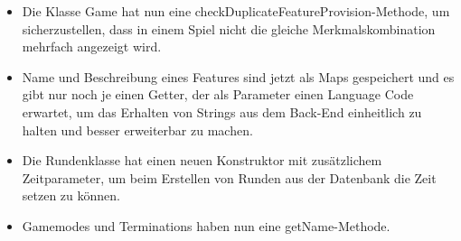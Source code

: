 \documentclass[a4paper]{scrreprt}
\begin{document}
\begin{itemize}
	\item Die Klasse Game hat nun eine checkDuplicateFeatureProvision-Methode, um sicherzustellen, dass in einem Spiel nicht die gleiche Merkmalskombination mehrfach angezeigt wird.
	\item Name und Beschreibung eines Features sind jetzt als Maps gespeichert und es gibt nur noch je einen Getter, der als Parameter einen Language Code erwartet, um das Erhalten von Strings aus dem Back-End einheitlich zu halten und besser erweiterbar zu machen.
	\item Die Rundenklasse hat einen neuen Konstruktor mit zusätzlichem Zeitparameter, um beim Erstellen von Runden aus der Datenbank die Zeit setzen zu können.
	\item Gamemodes und Terminations haben nun eine getName-Methode.
	
\end{itemize}
\end{document}
